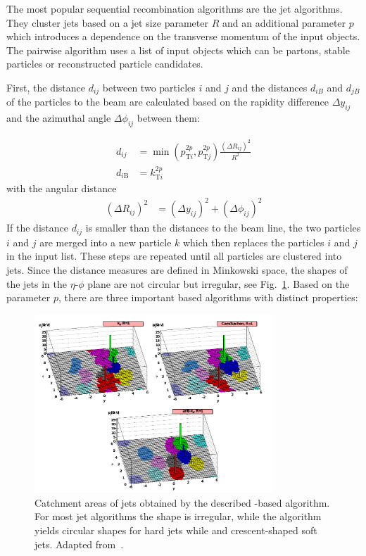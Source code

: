 The most popular sequential recombination algorithms are the \kt jet
algorithms. They cluster jets based on a jet size parameter $R$ and an
additional parameter $p$ which introduces a dependence on the transverse momentum of
the input objects. The pairwise algorithm uses a list of input objects which
can be partons, stable particles or reconstructed particle candidates.

First, the distance $d_{ij}$ between two particles $i$ and $j$ and the distances
$d_{iB}$ and $d_{jB}$ of the particles to the beam are calculated based on the
rapidity difference $\Delta y_{ij}$ and the azimuthal angle $\Delta \phi_{ij}$
between them:

\begin{align*} 
    d_{ij} &= \min(p_{\mathrm{T}i}^{2p},p_{\mathrm{T}j}^{2p})\frac{\left(\Delta
        R_{ij}\right)^2}{R^2}\\
    d_{i\mathrm{B}} &= k_{\mathrm{T}i}^{2p}
\end{align*} 
%
with the angular distance
%
\begin{align*}
    \left(\Delta R_{ij}\right)^2 &= (\Delta y_{ij})^2 + (\Delta \phi_{ij})^2
\end{align*} 
%
If the distance $d_{ij}$ is smaller than the distances to the beam line, the two
particles $i$ and $j$ are merged into a new particle $k$ which then replaces the
particles $i$ and $j$ in the input list. These steps are repeated until all
particles are clustered into jets. Since the distance measures are defined in
Minkowski space, the shapes of the jets in the $\eta$-$\phi$ plane are not circular but
irregular, see Fig.~\ref{fig:jet_shapes}. Based on the parameter $p$, there
are three important \kt based algorithms with distinct properties:

\begin{figure}[htbp]
    \centering
    \includegraphics[width=0.8\textwidth]{figures/theoretical_foundations/jet_shapes.pdf}
    \caption[Jet areas of various jet algorithms]{Catchment areas of jets
        obtained by the described \kt-based algorithm. For most jet algorithms the shape is
        irregular, while the \antikt algorithm yields circular shapes for hard
        jets while and crescent-shaped soft jets. Adapted
        from~\cite{Salam:2009jx}.}
    \label{fig:jet_shapes}
\end{figure}

